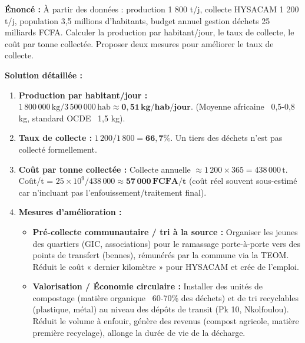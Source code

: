 \documentclass[11pt]{article}
\begin{document}
\begin{exoresolu}
\textbf{Énoncé :} À partir des données : production 1 800 t/j, collecte HYSACAM 1 200 t/j, population 3,5 millions d'habitants, budget annuel gestion déchets 25 milliards FCFA. Calculer la production par habitant/jour, le taux de collecte, le coût par tonne collectée. Proposer deux mesures pour améliorer le taux de collecte.

\textbf{Solution détaillée :}
\begin{enumerate}
    \item \textbf{Production par habitant/jour :} $1\,800\,000\,\text{kg} / 3\,500\,000\,\text{hab} \approx \mathbf{0,51\,\text{kg/hab/jour}}$. (Moyenne africaine ~0,5-0,8 kg, standard OCDE ~1,5 kg).
    \item \textbf{Taux de collecte :} $1\,200 / 1\,800 = \mathbf{66,7\%}$. Un tiers des déchets n'est pas collecté formellement.
    \item \textbf{Coût par tonne collectée :} Collecte annuelle $\approx 1\,200 \times 365 = 438\,000\,\text{t}$. Coût/t = $25 \times 10^9 / 438\,000 \approx \mathbf{57\,000\,\text{FCFA/t}}$ (coût réel souvent sous-estimé car n'incluant pas l'enfouissement/traitement final).
    \item \textbf{Mesures d'amélioration :}
    \begin{itemize}
        \item \textbf{Pré-collecte communautaire / tri à la source :} Organiser les jeunes des quartiers (GIC, associations) pour le ramassage porte-à-porte vers des points de transfert (bennes), rémunérés par la commune via la TEOM. Réduit le coût « dernier kilomètre » pour HYSACAM et crée de l'emploi.
        \item \textbf{Valorisation / Économie circulaire :} Installer des unités de compostage (matière organique ~60-70\% des déchets) et de tri recyclables (plastique, métal) au niveau des dépôts de transit (Pk 10, Nkolfoulou). Réduit le volume à enfouir, génère des revenus (compost agricole, matière première recyclage), allonge la durée de vie de la décharge.
    \end{itemize}
\end{enumerate}
\end{exoresolu}
\end{document}
